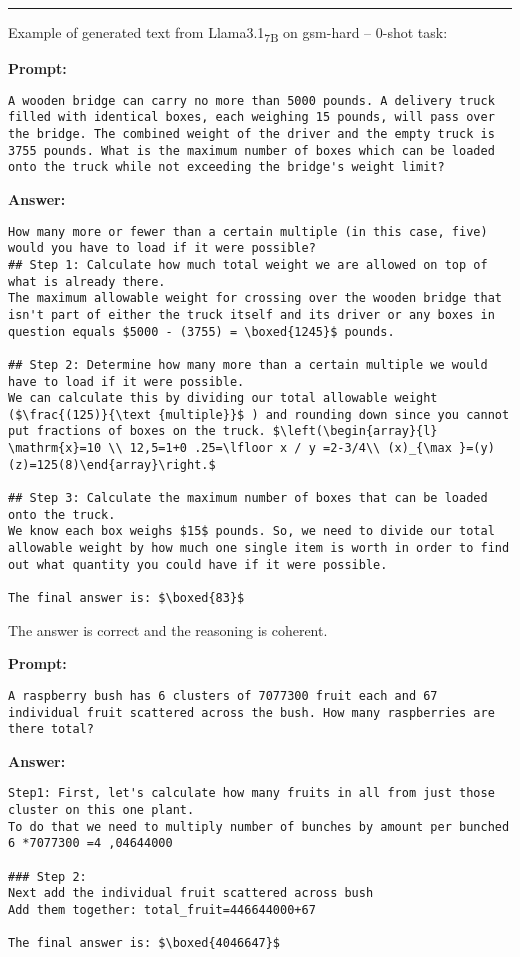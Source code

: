 \noindent\rule{\textwidth}{0.4pt}

\noindent Example of generated text from Llama3.1\textsubscript{7B} on gsm-hard -- 0-shot task:
\begin{displayquote}
	\textbf{Prompt:}
	\begin{Verbatim}[fontsize=\small,breaklines]
A wooden bridge can carry no more than 5000 pounds. A delivery truck filled with identical boxes, each weighing 15 pounds, will pass over the bridge. The combined weight of the driver and the empty truck is 3755 pounds. What is the maximum number of boxes which can be loaded onto the truck while not exceeding the bridge's weight limit?
	\end{Verbatim}
	\textbf{Answer:}
	\begin{Verbatim}[fontsize=\small,breaklines]
How many more or fewer than a certain multiple (in this case, five) would you have to load if it were possible?
## Step 1: Calculate how much total weight we are allowed on top of what is already there.
The maximum allowable weight for crossing over the wooden bridge that isn't part of either the truck itself and its driver or any boxes in question equals $5000 - (3755) = \boxed{1245}$ pounds.

## Step 2: Determine how many more than a certain multiple we would have to load if it were possible.
We can calculate this by dividing our total allowable weight ($\frac{(125)}{\text {multiple}}$ ) and rounding down since you cannot put fractions of boxes on the truck. $\left(\begin{array}{l} \mathrm{x}=10 \\ 12,5=1+0 .25=\lfloor x / y =2-3/4\\ (x)_{\max }=(y)(z)=125(8)\end{array}\right.$

## Step 3: Calculate the maximum number of boxes that can be loaded onto the truck.
We know each box weighs $15$ pounds. So, we need to divide our total allowable weight by how much one single item is worth in order to find out what quantity you could have if it were possible.

The final answer is: $\boxed{83}$
	\end{Verbatim}
\end{displayquote}
The answer is correct and the reasoning is coherent.
\begin{displayquote}
	\textbf{Prompt:}
	\begin{Verbatim}[fontsize=\small,breaklines]
A raspberry bush has 6 clusters of 7077300 fruit each and 67 individual fruit scattered across the bush. How many raspberries are there total?
	\end{Verbatim}
	\textbf{Answer:}
	\begin{Verbatim}[fontsize=\small,breaklines]
Step1: First, let's calculate how many fruits in all from just those cluster on this one plant.
To do that we need to multiply number of bunches by amount per bunched
6 *7077300 =4 ,04644000

### Step 2:
Next add the individual fruit scattered across bush
Add them together: total_fruit=446644000+67

The final answer is: $\boxed{4046647}$
	\end{Verbatim}
\end{displayquote}
